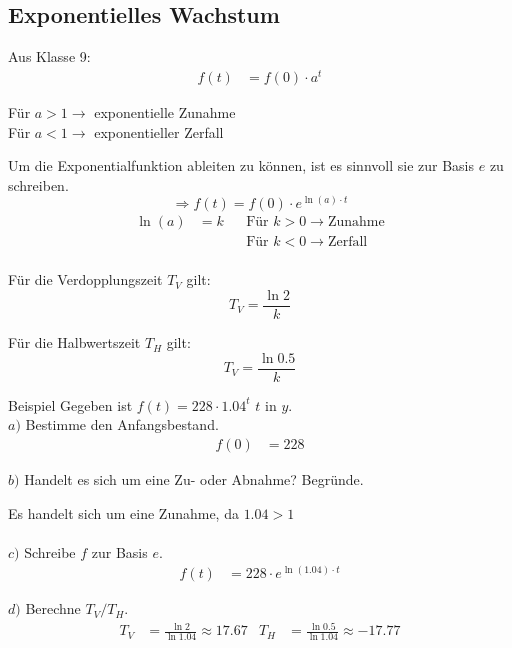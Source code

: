 \documentclass{article}
\begin{document}
\subsection{Exponentielles Wachstum}
Aus Klasse 9:
\begin{align*}
    f(t) &= f(0) \cdot a^t
\end{align*}
\begin{center}
    Für $a>1 \rightarrow$ exponentielle Zunahme \\
    Für $a<1 \rightarrow$ exponentieller Zerfall \\
\end{center}
\vspace{3mm}
Um die Exponentialfunktion ableiten zu können, ist es sinnvoll
sie zur Basis $e$ zu schreiben.
\[\Rightarrow f(t)=f(0)\cdot e^{\ln (a) \cdot t}\]
\begin{align*}
    &&&& \ln(a)&=k & &\text{Für }k>0 \rightarrow \text{Zunahme}&&&& \\
    &&&& & & &\text{Für }k<0 \rightarrow \text{Zerfall}&&&& \\
\end{align*}

Für die Verdopplungszeit $T_V$ gilt:
\[T_V = \frac{\ln 2}{k}\]

Für die Halbwertszeit $T_H$ gilt:
\[T_V = \frac{\ln 0.5}{k}\]

\begin{boxx}[DarkBlue]{Beispiel}
    Gegeben ist $f(t) = 228 \cdot 1.04^t$  $t$ in $y$. \\
    $a)$\hspace{3mm} Bestimme den Anfangsbestand.
    \begin{align*}
        f(0) &= 228
    \end{align*}

    $b)$\hspace{3mm} Handelt es sich um eine Zu- oder Abnahme? Begründe.

    Es handelt sich um eine Zunahme, da $1.04 > 1$ \\\\

    $c)$\hspace{3mm} Schreibe $f$ zur Basis $e$.
    \begin{align*}
        f(t) &= 228 \cdot e^{\ln(1.04)\cdot t}
    \end{align*}

    $d)$\hspace{3mm} Berechne $T_V/T_H$.
    \begin{align*}
        T_V&= \frac{\ln 2}{\ln 1.04} \approx 17.67 & T_H&= \frac{\ln 0.5}{\ln 1.04} \approx -17.77
    \end{align*}
\end{boxx}
\end{document}
